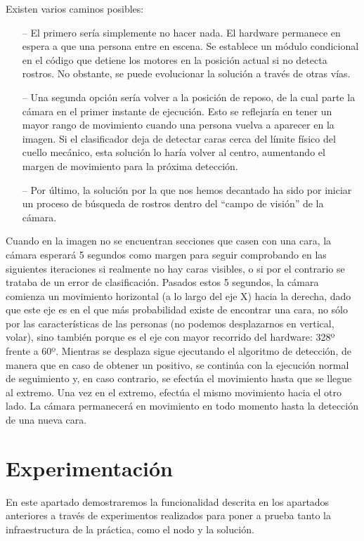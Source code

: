 Existen varios caminos posibles:

\begin{itemize}
	\item[--] El primero sería simplemente no hacer nada. El hardware permanece en espera a que una persona entre en escena. Se establece un módulo condicional en el código que detiene los motores en la posición actual si no detecta rostros. No obstante, se puede evolucionar la solución a través de otras vías.
	\item[--] Una segunda opción sería volver a la posición de reposo, de la cual parte la cámara en el primer instante de ejecución. Esto se reflejaría en tener un mayor rango de movimiento cuando una persona vuelva a aparecer en la imagen. Si el clasificador deja de detectar caras cerca del límite físico del cuello mecánico, esta solución lo haría volver al centro, aumentando el margen de movimiento para la próxima detección.
	\item[--] Por último, la solución por la que nos hemos decantado ha sido por iniciar un proceso de búsqueda de rostros dentro del “campo de visión” de la cámara. 
\end{itemize}

Cuando en la imagen no se encuentran secciones que casen con una cara, la cámara esperará 5 segundos como margen para seguir comprobando en las siguientes iteraciones si realmente no hay caras visibles, o si por el contrario se trataba de un error de clasificación. Pasados estos 5 segundos, la cámara comienza un movimiento horizontal (a lo largo del eje X) hacia la derecha, dado que este eje es en el que más probabilidad existe de encontrar una cara, no sólo por las características de las personas (no podemos desplazarnos en vertical, volar), sino también porque es el eje con mayor recorrido del hardware: 328º frente a 60º. Mientras se desplaza sigue ejecutando el algoritmo de detección, de manera que en caso de obtener un positivo, se continúa con la ejecución normal de seguimiento y, en caso contrario, se efectúa el movimiento hasta que se llegue al extremo. Una vez en el extremo, efectúa el mismo movimiento hacia el otro lado. La cámara permanecerá en movimiento en todo momento hasta la detección de una nueva cara.

\section{Experimentación}
En este apartado demostraremos la funcionalidad descrita en los apartados anteriores a través de experimentos realizados para poner a prueba tanto la infraestructura de la práctica, como el nodo y la solución.

